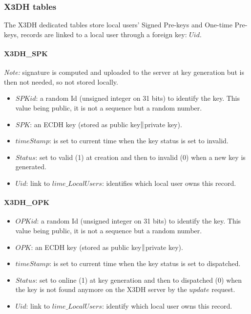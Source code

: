 \documentclass[a4paper,11pt]{article}
\begin{document}
    \subsubsection{X3DH tables}
    The X3DH dedicated tables store local users' Signed Pre-keys and One-time Pre-keys, records are linked to a local user through a foreign key: $Uid$.
    \paragraph*{X3DH\_SPK}
    \textit{Note:} signature is computed and uploaded to the server at key generation but is then not needed, so not stored locally.
    \begin{itemize}
      \item $SPKid$: a random Id (unsigned integer on 31 bits) to identify the key. This value being public, it is not a sequence but a random number.
      \item $SPK$: an ECDH key (stored as public key$\Arrowvert $private key).
      \item $timeStamp$: is set to current time when the key status is set to invalid.
      \item $Status$: set to valid (1) at creation and then to invalid (0) when a new key is generated.
      \item $Uid$: link to $lime\_LocalUsers$: identifies which local user owns this record.
    \end{itemize}
  
  \paragraph*{X3DH\_OPK}
    \begin{itemize}
      \item $OPKid$: a random Id (unsigned integer on 31 bits) to identify the key. This value being public, it is not a sequence but a random number.
      \item $OPK$: an ECDH key (stored as public key$\Arrowvert $private key).
      \item $timeStamp$: is set to current time when the key status is set to dispatched.
      \item $Status$: set to online (1) at key generation and then to dispatched (0) when the key is not found anymore on the X3DH server by the $update$ request.
      \item $Uid$: link to $lime\_LocalUsers$: identify which local user owns this record.
    \end{itemize}
              
\end{document}
